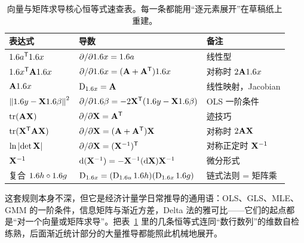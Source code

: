 \begin{table}[h]
\centering
\begin{tabular}{@{}lll@{}}
\toprule
表达式 & 导数 & 备注 \\
\midrule
$1.6 a^{\mathsf{T}}1.6 x$ & $\partial/\partial1.6 x=1.6 a$ & 线性型 \\
$1.6 x^{\mathsf{T}}\mathbf{A}1.6 x$ & $\partial/\partial1.6 x=(\mathbf{A}+\mathbf{A}^{\mathsf{T}})1.6 x$ & 对称时 $2\mathbf{A}1.6 x$ \\
$\mathbf{A}1.6 x$ & $\operatorname{D}_{1.6 x}=\mathbf{A}$ & 线性映射，Jacobian \\
$\left\|1.6 y-\mathbf{X}1.6\beta\right\|_{}^2$ & $\partial/\partial1.6\beta=-2\mathbf{X}^{\mathsf{T}}(1.6 y-\mathbf{X}1.6\beta)$ & OLS 一阶条件 \\
$\operatorname{tr}(\mathbf{A}\mathbf{X})$ & $\partial/\partial\mathbf{X}=\mathbf{A}^{\mathsf{T}}$ & 迹技巧 \\
$\operatorname{tr}(\mathbf{X}^{\mathsf{T}}\mathbf{A}\mathbf{X})$ & $\partial/\partial\mathbf{X}=(\mathbf{A}+\mathbf{A}^{\mathsf{T}})\mathbf{X}$ & 对称时 $2\mathbf{A}\mathbf{X}$ \\
$\ln\left|\det\mathbf{X}\right|$ & $\partial/\partial\mathbf{X}=({\mathbf{X}}^{-1})^{\mathsf{T}}$ & 对称正定时 ${\mathbf{X}}^{-1}$ \\
${\mathbf{X}}^{-1}$ & $\mathop{}\!\mathrm{d}({\mathbf{X}}^{-1})=-{\mathbf{X}}^{-1}(\mathop{}\!\mathrm{d}\mathbf{X}){\mathbf{X}}^{-1}$ & 微分形式 \\
复合 $1.6 h\circ1.6 g$ & $\operatorname{D}_{1.6 x}=(\operatorname{D}_{1.6 u}1.6 h)(\operatorname{D}_{1.6 x}1.6 g)$ & 链式法则 = 矩阵乘 \\
\bottomrule
\end{tabular}
\caption{向量与矩阵求导核心恒等式速查表。每一条都能用``逐元素展开''在草稿纸上重建。}
\label{tab:matcalc-cheatsheet}
\end{table}

这套规则本身不深，但它是经济计量学日常推导的通用语：OLS、GLS、MLE、GMM 的一阶条件，信息矩阵与渐近方差，Delta 法的雅可比——它们的起点都是``对一个向量或矩阵求导''。把表~\ref{tab:matcalc-cheatsheet} 里的几条恒等式连同``数行数列''的维数自检练熟，后面渐近统计部分的大量推导都能照此机械地展开。
